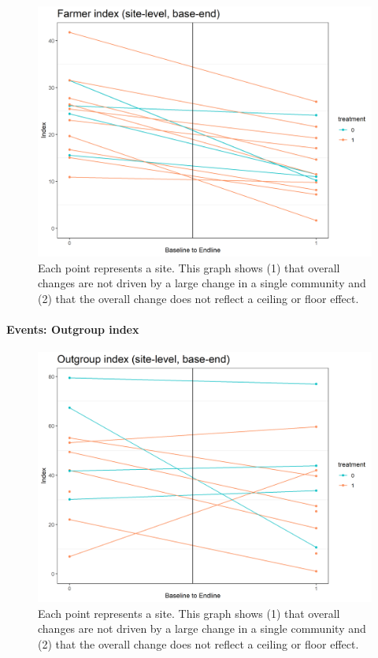 \documentclass[
]{article}
\begin{document}
\begin{figure}%
\centering
\includegraphics[width=\linewidth]{../obs_dat/b_analysis/market_farms_siteTime.plot.png}
\caption{Each point represents a site. This graph shows (1) that overall changes are not driven by a large change in a single community and (2) that the overall change does not reflect a ceiling or floor effect.}\label{fig:market_farm_siteTime}
\end{figure}

\hypertarget{events-outgroup-index}{%
\paragraph{Events: Outgroup index}\label{events-outgroup-index}}

\begin{figure}%
\centering
\includegraphics[width=\linewidth]{../obs_dat/b_analysis/events_outgroup_siteTime.plot.png}
\caption{Each point represents a site. This graph shows (1) that overall changes are not driven by a large change in a single community and (2) that the overall change does not reflect a ceiling or floor effect.}\label{fig:events_outgroup_siteTime}
\end{figure}
\end{document}
